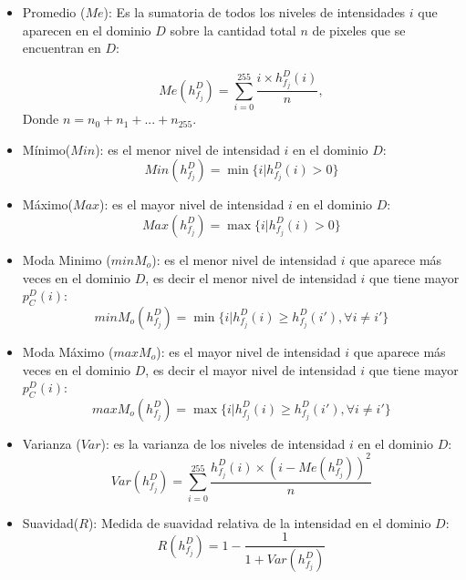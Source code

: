\begin{itemize}
    \item Promedio ($Me$): Es la sumatoria de todos los niveles de intensidades $i$ que aparecen en el dominio $D$ sobre la cantidad total $n$ de pixeles que se encuentran en $D$:
		
\begin{equation}
\label{promedio}
   Me(h_{f_j}^D) = \sum_{i=0}^{255}\frac{i\times h_{f_j}^D(i)}{n},
\end{equation}		
Donde $n = n_0 + n_1 + ... + n_{255}$.

    \item M\'inimo($Min$): es el menor nivel de intensidad $i$ en el dominio $D$:
\begin{equation}
\label{minimo}
	Min(h_{f_j}^D) = \min\{i|h_{f_j}^D(i)>0\}
\end{equation}		
		\item M\'aximo($Max$): es el mayor nivel de intensidad $i$ en el dominio $D$:
\begin{equation}
\label{maximo}
   Max(h_{f_j}^D) = \max\{i|h_{f_j}^D(i)>0\}
\end{equation}		
 		\item Moda Minimo ($minM_o$): es el menor nivel de intensidad $i$ que aparece m\'as veces en el dominio $D$, es decir el menor nivel de intensidad $i$ que tiene mayor $p_{C}^D(i)$:
\begin{equation}
\label{ModaMinimo}
   minM_o(h_{f_j}^D) = \min\{i|h_{f_j}^D(i) \geq h_{f_j}^D(i'), \forall i\neq i'\}
\end{equation}		
\item Moda M\'aximo ($maxM_o$): es el mayor nivel de intensidad $i$ que aparece m\'as veces en el dominio $D$, es decir el mayor nivel de intensidad $i$ que tiene mayor $p_{C}^D(i)$:
\begin{equation}
\label{ModaMinimo}
   maxM_o(h_{f_j}^D) = \max\{i|h_{f_j}^D(i) \geq h_{f_j}^D(i'), \forall i\neq i'\}
\end{equation}				
    
		
		\item Varianza ($Var$): es la varianza de los niveles de intensidad $i$ en el dominio $D$:
  \begin{equation}
\label{varianza}
   Var(h_{f_j}^D) = \sum_{i=0}^{255}\frac{h_{f_j}^D(i)\times(i - Me(h_{f_j}^D))^2}{n}
\end{equation}		
		\item Suavidad($R$): Medida de suavidad relativa de la intensidad en el dominio $D$:
 \begin{equation}
\label{Suavidad}
   R(h_{f_j}^D) = 1-\frac{1}{1+Var(h_{f_j}^D)}
\end{equation}		
		

\end{itemize}


